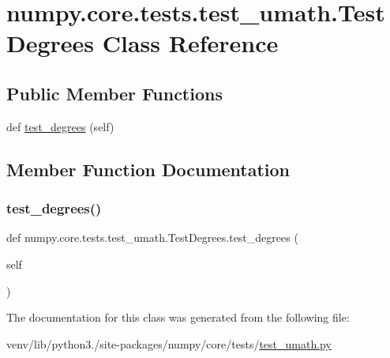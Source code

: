 \hypertarget{classnumpy_1_1core_1_1tests_1_1test__umath_1_1TestDegrees}{}\section{numpy.\+core.\+tests.\+test\+\_\+umath.\+Test\+Degrees Class Reference}
\label{classnumpy_1_1core_1_1tests_1_1test__umath_1_1TestDegrees}
\subsection*{Public Member Functions}
\begin{DoxyCompactItemize}
\item 
def \hyperlink{classnumpy_1_1core_1_1tests_1_1test__umath_1_1TestDegrees_ad36dc0c857d09c4512d108949aa08297}{test\+\_\+degrees} (self)
\end{DoxyCompactItemize}


\subsection{Member Function Documentation}
\mbox{\label{classnumpy_1_1core_1_1tests_1_1test__umath_1_1TestDegrees_ad36dc0c857d09c4512d108949aa08297}} 
\subsubsection{\texorpdfstring{test\+\_\+degrees()}{test\_degrees()}}
{\footnotesize\ttfamily def numpy.\+core.\+tests.\+test\+\_\+umath.\+Test\+Degrees.\+test\+\_\+degrees (\begin{DoxyParamCaption}\item[{}]{self }\end{DoxyParamCaption})}



The documentation for this class was generated from the following file\+:\begin{DoxyCompactItemize}
\item 
venv/lib/python3./site-\/packages/numpy/core/tests/\hyperlink{test__umath_8py}{test\+\_\+umath.\+py}\end{DoxyCompactItemize}
